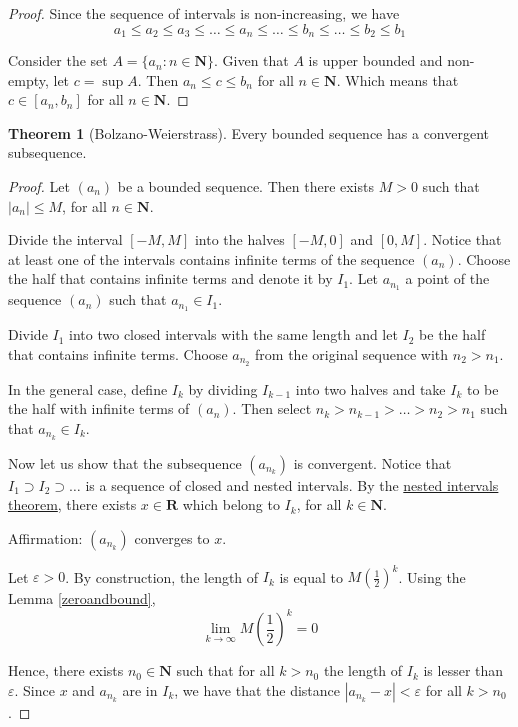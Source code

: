\documentclass[tikz,12pt,a4paper]{article}
\theoremstyle{definition}
\newtheorem{theorem}{Theorem}[section]
\begin{document}
\begin{proof}
	Since the sequence of intervals is non-increasing, we have
	\[
		a_1 \leq a_2 \leq a_3 \leq \ldots \leq a_n \leq \ldots \leq b_n \leq \ldots \leq b_2 \leq b_1
	\]
	
	Consider the set $A = \{ a_n : n \in \textbf{N} \}$. Given that $A$ is upper bounded and non-empty, let $c = \sup A$. Then $a_n \leq c \leq b_n$ for all $n \in \textbf{N}$. Which means that $c \in [a_n, b_n]$ for all $n \in \textbf{N}$.
\end{proof}

\begin{theorem}[Bolzano-Weierstrass]\label{bolz-weier}
	Every bounded sequence has a convergent subsequence.
\end{theorem}

\begin{proof}
	Let $(a_n)$ be a bounded sequence. Then there exists $M > 0$ such that $|a_n| \leq M$, for all $n \in \textbf{N}$.
	
	Divide the interval $[-M,M]$ into the halves $[-M,0]$ and $[0,M]$. Notice that at least one of the intervals contains infinite terms of the sequence $(a_n)$. Choose the half that contains infinite terms and denote it by $I_1$. Let $a_{n_1}$ a point of the sequence $(a_n)$ such that $a_{n_1} \in I_1$.
	
	Divide $I_1$ into two closed intervals with the same length and let $I_2$ be the half that contains infinite terms. Choose $a_{n_2}$ from the original sequence with $n_2 > n_1$.
	
	In the general case, define $I_k$ by dividing $I_{k-1}$ into two halves and take $I_k$ to be the half with infinite terms of $(a_n)$. Then select $n_k > n_{k-1} > \ldots > n_2 > n_1$ such that $a_{n_k}\in I_k$. 
	
	Now let us show that the subsequence $(a_{n_k})$ is convergent. Notice that $I_1 \supset I_2 \supset \ldots$ is a sequence of closed and nested intervals. By the \hyperref[nested-intervals]{nested intervals theorem}, there exists $x \in \textbf{R}$ which belong to $I_k$, for all $k \in \textbf{N}$. 
	
	Affirmation: $(a_{n_k})$ converges to $x$. 
	
	Let $\varepsilon > 0$. By construction, the length of $I_k$ is equal to $M \left( \frac{1}{2} \right)^k$. Using the Lemma \ref{zeroandbound}, 
	\[
		\lim_{k \to \infty} M \left( \frac{1}{2} \right)^k = 0
	\]
	
	Hence, there exists $n_0 \in \textbf{N}$ such that for all $k > n_0$ the length of $I_k$ is lesser than $\varepsilon$. Since $x$ and $a_{n_k}$ are in $I_k$, we have that the distance $|a_{n_k} - x| < \varepsilon$ for all $k > n_0$.
\end{proof}
\end{document}
